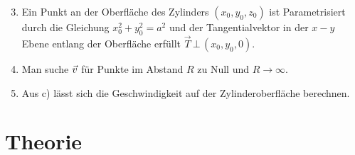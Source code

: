 \documentclass[12pt]{article}
\begin{document}
\begin{tips}{2}
    \begin{enumerate}[label=\alph*.]
        \setcounter{enumi}{2}
        \item Ein Punkt an der Oberfläche des Zylinders $(x_0,y_0,z_0)$ ist Parametrisiert durch die Gleichung $x_0^2+y_0^2=a^2$ und der Tangentialvektor in der $x-y$ Ebene entlang der Oberfläche erfüllt $\vec{T}\,\bot\,(x_0,y_0,0)$.
        \item Man suche $\vec{v}$ für Punkte im Abstand $R$ zu Null und $R\to\infty$.
        \item Aus c) lässt sich die Geschwindigkeit auf der Zylinderoberfläche berechnen.
    \end{enumerate}
\end{tips}\vspace*{1em}


\section{Theorie}



\end{document}
